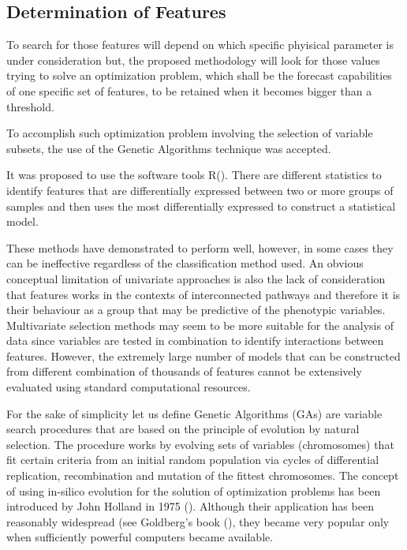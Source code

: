 \subsection{Determination of Features}
\label{subsec:DF}
{
To search for those features will depend on which specific phyisical parameter is 
under consideration but, the proposed methodology will look for those values 
trying to solve an optimization problem, which shall be the forecast capabilities
of one specific set of features, to be retained when it becomes bigger than 
a threshold.

To accomplish such optimization problem involving the selection of variable 
subsets, the use of the Genetic Algorithms technique was accepted. 
}

{
It was proposed to use the software tools R(\cite{R2013}).
There are different statistics to identify features 
that are differentially expressed between
two or more groups of samples and then uses the most differentially
expressed to construct a statistical model.
}

{
These methods have 
demonstrated to perform well, however, in some cases they can be ineffective
regardless of the classification method used. An obvious conceptual limitation
of univariate approaches is also the lack of consideration that features works in
the contexts of interconnected pathways and therefore it is their behaviour as
a group that may be predictive of the phenotypic variables. Multivariate
selection methods may seem to be more suitable for the analysis of 
data since variables are tested in
combination to identify interactions between features. However, the extremely
large number of models that can be constructed from different combination of
thousands of features cannot be extensively evaluated using standard
computational resources.
}

{
For the sake of simplicity let us define 
Genetic Algorithms (GAs) are variable search procedures that are based on
the principle of evolution by natural selection. The procedure works by
evolving sets of variables (chromosomes) that fit certain criteria from an initial
random population via cycles of differential replication, recombination and
mutation of the fittest chromosomes. The concept of using in-silico evolution
for the solution of optimization problems has been introduced by John
Holland in 1975 (\cite{holland1975adaptation}). Although their application has been
reasonably widespread (see Goldberg\textquoteright s 
book (\cite{goldberg1989genetic}), they became
very popular only when sufficiently powerful computers became available.
}


